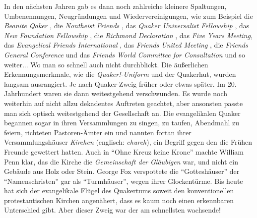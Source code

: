In den nächsten Jahren gab es dann noch zahlreiche kleinere Spaltungen,
Umbenennungen, Neugründungen und Wiedervereinigungen, wie zum Beispiel die
\textit{Beanite Qaker} , die \textit{Nontheist
Friends} , das \textit{Quaker Universalist
Fellowship} , das \textit{New
Foundation Fellowship} , die
\textit{Richmond Declaration} , das \textit{Five
Years Meeting}, das \textit{Evangelical Friends International}
, das \textit{Friends United
Meeting} , die \textit{Friends General
Conference}  und das \textit{Friends
World Committee for Consultation} und so weiter... Wo man so schnell auch nicht
durchblickt.
Die äußerlichen Erkennungsmerkmale, wie die \textit{Quaker!-Uniform}
 und der Quakerhut, wurden
langsam ausrangiert. Je nach Quaker-Zweig früher oder etwas später. Im 20.
Jahrhundert waren sie dann weitestgehend verschwunden. Es wurde noch weiterhin
auf
nicht allzu dekadentes Auftreten geachtet, aber ansonsten passte man sich
optisch weitestgehend der Gesellschaft an. Die evangelikalen Quaker begannen
sogar in ihren Versammlungen zu singen, zu taufen, Abendmahl zu feiern,
richteten Pastoren-Ämter ein und nannten
fortan ihrer Versammlungshäuser \textit{Kirchen} 
(englisch: \textit{church}),
ein Begriff gegen den die Frühen Freunde gewettert hatten. Auch in "`Ohne Kreuz
keine Krone"' machte William Penn klar, das die Kirche die \textit{Gemeinschaft
der
Gläubigen} war, und nicht ein Gebäude aus Holz oder Stein. George Fox
verspottete
die "`Gotteshäuser"' der "`Namenschristen"' gar als
"`Turmhäuser"', wegen ihrer
Glockentürme. Bis heute hat sich der evangelikale Flügel des Quakertums soweit
den konventionellen protestantischen Kirchen angenähert, dass es kaum noch
einen
erkennbaren Unterschied gibt. Aber dieser Zweig war der am schnellsten
wachsende!

\medskip


